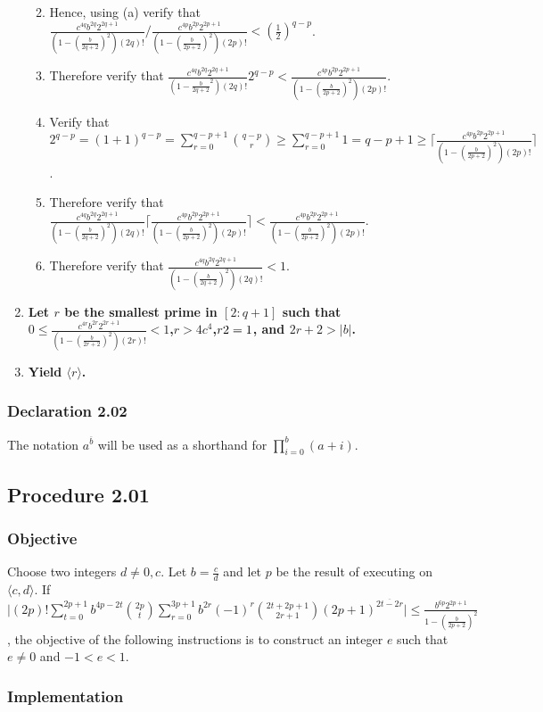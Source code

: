 \documentclass[twocolumn]{article}
\let\mod\relax
\DeclareMathOperator{\mod}{mod}
\newcommand{\ol}[1]{\overline{#1}}
\newcommand{\declaration}[1]{\subsubsection*{Declaration #1}\label{sec:declaration #1}}
\newcommand{\procedure}[2][]{\subsection*{Procedure #2 \ifthenelse{\equal{#1}{}}{}{(#1)}}\label{sec:procedure #2}}
\newcommand{\objective}{\subsubsection*{Objective}}
\newcommand{\implementation}{\subsubsection*{Implementation}}
\newcommand{\procedurehr}[2][]{\hyperref[sec:procedure #2]{\ifthenelse{\equal{#1}{}}{procedure #2}{#1}}}
\begin{document}
\begin{enumerate}
\begin{enumerate}
\begin{enumerate}
						\end{enumerate}
						\item Hence, using (a) verify that $\frac{c^{4q}b^{2q}2^{2q+1}}{(1-(\frac{b}{2q+2})^2)(2q)!}/\frac{c^{4p}b^{2p}2^{2p+1}}{(1-(\frac{b}{2p+2})^2)(2p)!}<(\frac{1}{2})^{q-p}$.
						\item Therefore verify that $\frac{c^{4q}b^{2q}2^{2q+1}}{(1-\frac{b}{2q+2}^2)(2q)!}2^{q-p}<\frac{c^{4p}b^{2p}2^{2p+1}}{(1-(\frac{b}{2p+2})^2)(2p)!}$.
						\item Verify that $2^{q-p}=(1+1)^{q-p}=\sum_{r=0}^{q-p+1}\binom{q-p}{r}\ge\sum_{r=0}^{q-p+1} 1=q-p+1\ge\lceil\frac{c^{4p}b^{2p}2^{2p+1}}{(1-(\frac{b}{2p+2})^2)(2p)!}\rceil$.
						\item Therefore verify that $\frac{c^{4q}b^{2q}2^{2q+1}}{(1-(\frac{b}{2q+2})^2)(2q)!}\lceil\frac{c^{4p}b^{2p}2^{2p+1}}{(1-(\frac{b}{2p+2})^2)(2p)!}\rceil<\frac{c^{4p}b^{2p}2^{2p+1}}{(1-(\frac{b}{2p+2})^2)(2p)!}$.
						\item Therefore verify that $\frac{c^{4q}b^{2q}2^{2q+1}}{(1-(\frac{b}{2q+2})^2)(2q)!}<1$.
					\end{enumerate}
					\item \textbf{Let $r$ be the smallest prime in $[2:q+1]$ such that $0\le\frac{c^{4r}b^{2r}2^{2r+1}}{(1-(\frac{b}{2r+2})^2)(2r)!}<1$,$r>4c^4$,$r\mod 2=1$, and $2r+2>\lvert b\rvert$.}
					\item \textbf{Yield $\langle r\rangle$.}
				\end{enumerate}
		\declaration{2.02}
			The notation $a^{\ol{b}}$ will be used as a shorthand for $\prod_{i=0}^b(a+i)$.
		\procedure{2.01}
			\objective
				Choose two integers $d\ne 0,c$. Let $b=\frac{c}{d}$ and let $p$ be the result of executing \procedurehr{2.00} on $\langle c,d\rangle$. If $\lvert(2p)!\sum_{t=0}^{2p+1}b^{4p-2t}\binom{2p}{t}\sum_{r=0}^{3p+1}b^{2r}(-1)^r\binom{2t+2p+1}{2r+1}(2p+1)^{\ol{2t-2r}}\rvert\le\frac{b^{6p}2^{2p+1}}{1-(\frac{b}{2p+2})^2}$, the objective of the following instructions is to construct an integer $e$ such that $e\ne 0$ and $-1<e<1$.
			\implementation
\end{document}

